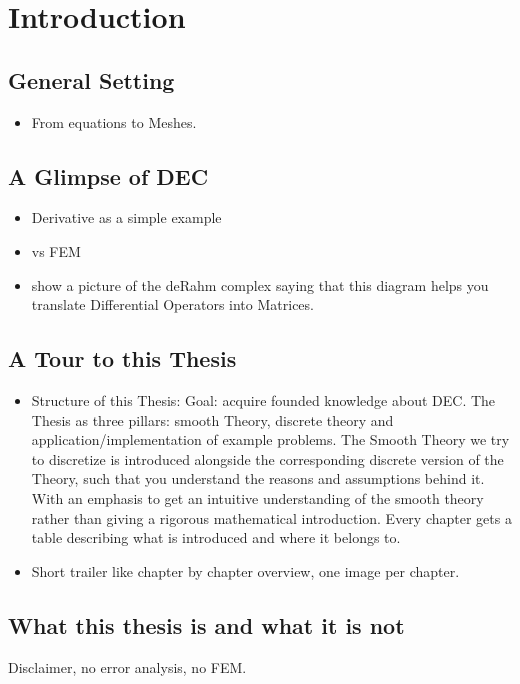 \chapter{Introduction}
	
	\section{General Setting}
		\begin{itemize}
			\item From equations to Meshes.
		\end{itemize}
	\section{A Glimpse of DEC}
		\begin{itemize}
			\item Derivative as a simple example 
			\item vs FEM 
			\item show a picture of the deRahm complex saying that this diagram helps you translate Differential Operators into Matrices.
		\end{itemize}

	\section{A Tour to this Thesis}
		\begin{itemize}
		\item	Structure of this Thesis: Goal: acquire founded knowledge about DEC. The Thesis as three pillars: smooth Theory, discrete theory and application/implementation of example problems. The Smooth Theory we try to discretize is introduced alongside the corresponding discrete version of the Theory, such that you understand  the reasons and assumptions behind it. With an emphasis to get an intuitive understanding of the smooth theory rather than giving a rigorous mathematical introduction. Every chapter gets a table describing what is introduced and where it belongs to.
		
		\item Short trailer like chapter by chapter overview, one image per chapter.
		\end{itemize}
		
	\section{What this thesis is and what it is not}
		Disclaimer, no error analysis, no FEM.
	